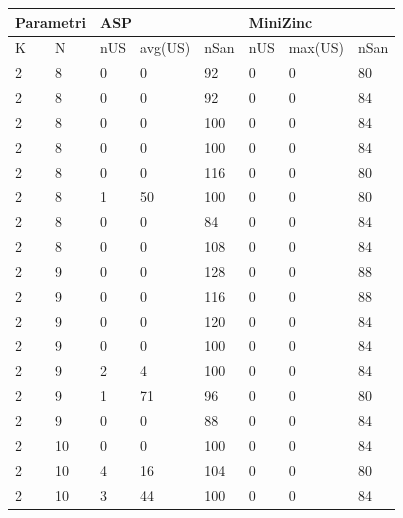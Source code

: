 \documentclass[12pt, italian, openany]{book}
\begin{document}
\begin{table}[]
\begin{tabular}{ll|lll|lll}
\multicolumn{2}{l|}{Parametri} & \multicolumn{3}{l|}{ASP} & \multicolumn{3}{l}{MiniZinc} \\ \hline
K             & N              & nUS    & avg(US)   & nSan     & nUS      & max(US)     & nSan     \\ \hline
2           & 8            & 0    & 0         & 92    & 0    & 0         & 80   \\
2           & 8            & 0    & 0         & 92    & 0    & 0         & 84   \\
2           & 8            & 0    & 0         & 100   & 0    & 0         & 84   \\
2           & 8            & 0    & 0         & 100   & 0    & 0         & 84   \\
2           & 8            & 0    & 0         & 116   & 0    & 0         & 80   \\
2           & 8            & 1    & 50        & 100   & 0    & 0         & 80   \\
2           & 8            & 0    & 0         & 84    & 0    & 0         & 84   \\
2           & 8            & 0    & 0         & 108   & 0    & 0         & 84   \\
2           & 9            & 0    & 0         & 128   & 0    & 0         & 88   \\
2           & 9            & 0    & 0         & 116   & 0    & 0         & 88   \\
2           & 9            & 0    & 0         & 120   & 0    & 0         & 84   \\
2           & 9            & 0    & 0         & 100   & 0    & 0         & 84   \\
2           & 9            & 2    & 4         & 100   & 0    & 0         & 84   \\
2           & 9            & 1    & 71        & 96    & 0    & 0         & 80   \\
2           & 9            & 0    & 0         & 88    & 0    & 0         & 84   \\
2           & 10           & 0    & 0         & 100   & 0    & 0         & 84   \\
2           & 10           & 4    & 16        & 104   & 0    & 0         & 80   \\
2           & 10           & 3    & 44        & 100   & 0    & 0         & 84   \\

\end{tabular}
\end{table}
\end{document}
